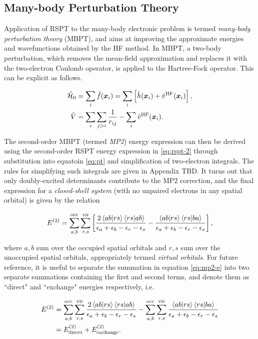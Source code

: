 \subsection{Many-body Perturbation Theory}

Application of RSPT to the many-body electronic problem is termed
\emph{many-body perturbation theory} (MBPT), and aims at improving the
approximate energies and wavefunctions obtained by the HF method. In MBPT, a
two-body perturbation, which removes the mean-field approximation and replaces
it with the two-electron Coulomb operator, is applied to the Hartree-Fock
operator. This can be explicit as follows.

\begin{align}
	\hamil_0 &=  \sum_i \hat f(\bm x_i) = \sum_i \left[ \hat h(\bm x_i) + \hat v^\text{HF}(\bm x_i) \right], \\
	\hat V &= \sum_i \sum_{j > i} \frac{1}{r_{ij}} - \sum_i \hat v^\text{HF}(\bm x_i).
\end{align}

The second-order MBPT (termed \emph{MP2}) energy expression can then be derived
using the second-order RSPT energy expression in \ref{eq:rspt-2} through
substitution into equatoin \ref{eq:pt} and simplification of two-electron
integrals. The rules for simplifying such integrals are given in Appendix TBD.
It turns out that only doubly-excited determinants contribute to the MP2
correction, and the final expression for a \emph{closed-shell system} (with no
unpaired electrons in any spatial orbital) is given by the relation

\begin{equation}
	\perturbE[]{2} =
	\sum_{a,b}^{\text{occ}} \sum_{r,s}^{\text{vir}}
	\left[
	\frac{2\braket{ab|rs}\braket{rs|ab}}{\eps_a + \eps_b - \eps_r -\eps_s}
	-
	\frac{\braket{ab|rs}\braket{rs|ba}}{\eps_a + \eps_b - \eps_r -\eps_s}
	\right],
	\label{eq:mp2-e}
\end{equation}

\noindent where $a,b$ sum over the occupied spatial orbitals and $r,s$ sum over
the unoccupied spatial orbitals, appropriately termed \emph{virtual orbitals}.
For future reference, it is useful to separate the summation in equation
\ref{eq:mp2-e} into two separate summations containing the first and second
terms, and denote them as ``direct" and ``exchange" energies respectively, i.e.


\begin{equation}
\begin{split}
	\perturbE[]{2} &=
	\sum_{a,b}^{\text{occ}} \sum_{r,s}^{\text{vir}}
	\frac{2\braket{ab|rs}\braket{rs|ab}}{\eps_a + \eps_b - \eps_r -\eps_s}
	-
	\sum_{a,b}^{\text{occ}} \sum_{r,s}^{\text{vir}}
	\frac{\braket{ab|rs}\braket{rs|ba}}{\eps_a + \eps_b - \eps_r -\eps_s}
	\\
	&= \perturbE[\text{direct}]{2} + \perturbE[\text{exchange}]{2}.
\end{split}
\end{equation}

